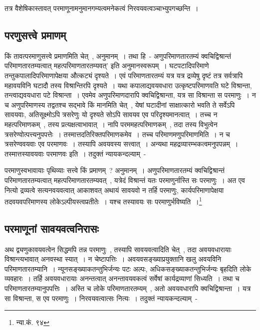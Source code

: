 	तत्र वैशेषिकास्तावत् परमाणूनामनुमानगम्यत्वमनेकत्वं निरवयवत्वञ्चाभ्युपगच्छन्ति~।

		\subsection{परणुसत्त्वे प्रमाणम्}

		किं तावत्परमाणुसत्त्वे प्रमाणमिति चेत्~, अनुमानम्~। तथा हि~- अणुपरिमाणतारतम्यं क्वचिद्विश्रान्तं परिमाणतारतम्यत्वात् महत्परिमाणतारतम्यवत्' इति अनुमानस्वरूपम्~। घटपटादिपरिमाणे तन्तुकपालादिपरिमाणापेक्षया औत्कट्यं दृश्यते~। एवं परिमाणतारतम्यं यत्र यत्र द्रव्येषु दृष्टं तत्र सर्वत्रापि महावयविनि घटादौ तस्य विश्रान्तिरपि दृश्यते~। यथा कपालाद्यवयवधारा उत्कृष्टपरिमाणवति घटे विश्रान्ता, तन्त्वाद्यवयधारा पटे विश्रान्ता~। एवमेव अणुपरिमाणदारापि क्वचिद्विश्रान्ता, यत्र सा विश्रान्ता स परमाणुः~। न च अणुपरिमाणस्य तद्वतश्च सद्भावे किं मानमिति चेत्~, येषां घटादीनां साक्षात्कारो भवति ते सर्वेऽपि सावयवाः, अतिसूक्ष्मोऽपि त्रसरेणुः यो दृश्यते सोऽपि सावयव एव परिदृश्यमानत्वात्~। तच्च न महत्परिमाणकम्~, तस्य प्रत्यक्षत्वाभावात्~। नापि परममहत्परिमाणकम्~, तदा तस्य विभुत्वेन त्रसरेण्वोत्पत्त्यनुपपत्तेः~। तस्मात्तदतिरिक्तपरिमाणकमेव~। तच्च परिमाणमणुपरिमाणमिति~। न च त्रसरेण्ववयवाः एव परमाणवः~। तस्यापि अवयवस्य सत्त्वात्~। अन्यथा महद्रव्यारम्भकत्वमनुपपन्नम्~। तस्मात्तस्यावयवाः परमाणवः इति~। तदुक्तं न्यायकन्दल्याम्~- 

		{\fontsize{11.7}{0}\selectfont\s परमाणुस्वभावायाः पृथिव्याः सत्त्वे किं प्रमाणम्~? अनुमानम्~। अणुपरिमाणतारतम्यं क्वचिद्विश्रान्तं परिमाणतारतम्यत्वात् महत्परिमाणतारतम्यवत्~, यत्रेदं विश्रान्तं यतः परमाणुर्नास्ति सः परमाणुः~। अत एव नित्यो द्रव्यत्वे सत्यनवयवत्वात् आकाशवत् अथायं सावयवो न तर्हि परमाणुः, कार्यपरिमाणापेक्षया तदवयवपरिमाणस्य लोकेऽल्पीयस्त्वप्रतीतेः~। यश्च तस्यावयः सः परमाणुर्भविष्यति~।\footnote{न्या.कं. ९४}}

		\subsection{परमाणूनां सावयवत्वनिरासः}

		अथ द्व्यणुकावयवत्वेन सिद्धमपि तन्न परमाणुः~, तस्यापि सावयवत्वादिति चेत्~, तदा अवयवधारायाः विश्रान्त्यभावात् अनवस्था स्यात्~। न चेष्टापत्तिः~। अवयवसङ्ख्याप्रयुक्तानि खलु  अवयविनि परिमाणतारतम्यानि~। न्यूनसङ्ख्याकतन्तुभिर्जन्यः पटः अल्पः, अधिकसङ्ख्याकतन्तुभिर्जन्यः बृहदिति लोके व्यवहारः~। तर्हि अवयवधारायाः अनन्तत्वात् अनन्तावयवकत्वं सर्वेषां कार्यद्रव्याणां सिध्यति~। तथा च परिमाणतारतम्यानुपपत्तिः~। अस्ति च लोके परिमाणतारतम्यम्~, अतो अवयवधारापि क्वचिद्विश्रान्ता~। यत्र सा विश्रान्ता, स एव परमाणुः~। निरवयवत्वात्सः नित्यः~। तदुक्तं न्यायकन्दल्याम्~- 

